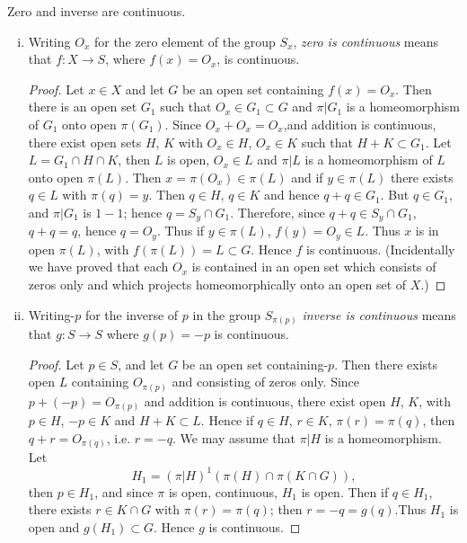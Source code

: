 \begin{proposition}%
 Zero and inverse are continuous.
\end{proposition}
\begin{enumerate}[(i)]
\item Writing $O_x$ for the zero element of the group $S_x$,
  \textit{zero is continuous} means that $f:X \to S$, where $f(x)
  =O_x$, is continuous. 

\begin{proof}
Let $x \in X$ and let $G$ be an open set containing $f(x)=O_x$. Then
there is an open set $G_1$ such that $O_x \in G_1 \subset G$ and
$\pi|G_1$ is a homeomorphism of $G_1$ onto open $\pi(G_1)$. Since
$O_x+ O_x = O_x$,\pageoriginale and addition is continuous, there
exist open sets 
$H$, $K$ with $O_x \in H$, $O_x \in K$ such that $H+K \subset G_1$. Let $L=
G_1 \cap H \cap K$, then $L$ is open, $O_x \in L$ and $\pi|L$ is a
homeomorphism of $L$ onto open $\pi(L)$. Then $x= \pi(O_x) \in \pi(L)$
and if $y \in \pi(L)$ there exists $q \in L$ with $\pi(q) =y$. Then $q
\in H$, $q \in K$ and hence $q+q \in G_1$. But $q \in G_1$, and
$\pi|G_1$ is $1-1$; hence $q= S_y \cap G_1$. Therefore, since $q+q \in
S_y \cap G_1$, $q+q=q$, hence $q=O_y$. Thus if $y \in \pi (L)$, $f(y) =
O_y \in L$. Thus $x$ is in open $\pi (L)$, with $f(\pi(L))=L \subset
G$. Hence $f$ is continuous. (Incidentally we have proved that each
$O_x$ is contained in an open set which consists  of zeros only and
which projects homeomorphically onto an open set of  $X$.) 
\end{proof}

\item Writing-$p$ for the inverse of $p$ in the group
  $S_{\pi(p)}$ \textit{inverse is continuous} means that $g: S \to S$ 
  where $g(p)=-p$ is continuous. 

\begin{proof}
Let $p \in S$, and let $G$ be an open set containing-$p$. Then there
exists open $L$ containing $O_{\pi (p)}$ and consisting of zeros
only. Since $p+(-p)= O_{\pi (p)}$ and addition is continuous, there
exist open $H$, $K$, with $p \in H$, $-p \in K$ and $H+K \subset L$. Hence
if $q \in H$, $r \in K$, $\pi(r) = \pi(q)$, then $q+r = O_{\pi(q)}$,
i.e. $r=-q$. We may assume that $\pi|H$ is a homeomorphism. Let  
$$
H_1= (\pi|H)^1 (\pi(H)\cap \pi (K \cap G)), 
$$
then $p \in H_1$, and since $\pi$ is open, continuous, $H_1$ is
open. Then if $q \in H_1$, there exists $r \in K \cap G$ with $\pi(r)
= \pi(q)$; then $r=-q=g(q)$.\pageoriginale Thus $H_1$ is open and
$g(H_1) \subset 
G$. Hence $g$ is continuous. 
\end{proof}
\end{enumerate}

